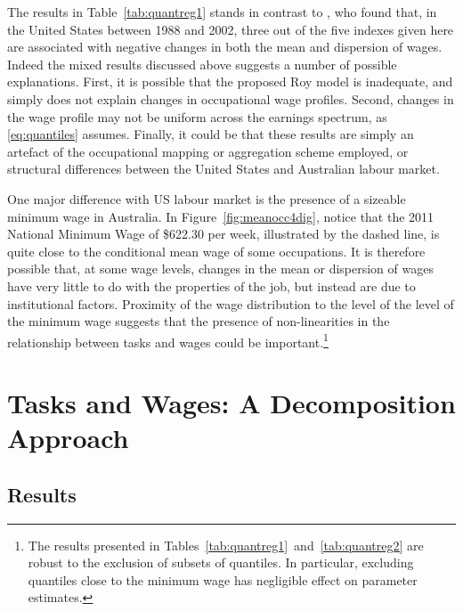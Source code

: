 The results in Table~\ref{tab:quantreg1} stands in contrast to \citet{Firpo2011}, who found that, in the United States between 1988 and 2002, three out of the five indexes given here are associated with negative changes in both the mean and dispersion of wages. Indeed the mixed results discussed above suggests a number of possible explanations. First, it is possible that the proposed Roy model is inadequate, and simply does not explain changes in occupational wage profiles. Second, changes in the wage profile may not be uniform across the earnings spectrum, as \eqref{eq:quantiles} assumes. Finally, it could be that these results are simply an artefact of the occupational mapping or aggregation scheme employed, or structural differences between the United States and Australian labour market.

One major difference with US labour market is the presence of a sizeable minimum wage in Australia. In Figure~\ref{fig:meanocc4dig}, notice that the 2011 National Minimum Wage of \$622.30 per week, illustrated by the dashed line, is quite close to the conditional mean wage of some occupations. It is therefore possible that, at some wage levels, changes in the mean or dispersion of wages have very little to do with the properties of the job, but instead are due to institutional factors. Proximity of the wage distribution to the level of the level of the minimum wage suggests that the presence of non-linearities in the relationship between tasks and wages could be important.\footnote{The results presented in Tables~\ref{tab:quantreg1}~and~\ref{tab:quantreg2} are robust to the exclusion of subsets of quantiles. In particular, excluding quantiles close to the minimum wage has negligible effect on parameter estimates.}

\section{Tasks and Wages: A Decomposition Approach}



\subsection{Results}

